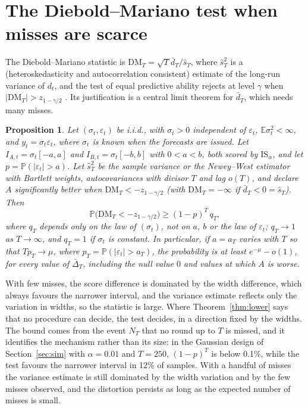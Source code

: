 \documentclass[11pt]{article}
\newtheorem{proposition}{Proposition}
\theoremstyle{remark}
\theoremstyle{definition}
\newcommand{\E}{\mathbb{E}}
\renewcommand{\Pr}{\mathbb{P}}
\newcommand{\IS}{\mathrm{IS}}
\newcommand{\Dbar}{\bar\Delta}
\begin{document}
\section{The Diebold--Mariano test when misses are scarce}
\label{sec:dm}

The Diebold--Mariano statistic is
$\mathrm{DM}_T=\sqrt T\bar d_T/\hat s_T$, where $\hat s_T^2$ is a
(heteroskedasticity and autocorrelation consistent) estimate of the
long-run variance of $d_t$, and the test of equal predictive ability
rejects at level $\gamma$ when $|\mathrm{DM}_T|>z_{1-\gamma/2}$
\citep{diebold1995comparing,newey1987simple}. Its justification is a central
limit theorem for $\bar d_T$, which needs many misses.

\begin{proposition}
\label{prop:dm}
Let $(\sigma_t,\varepsilon_t)$ be i.i.d., with $\sigma_t>0$ independent of
$\varepsilon_t$, $\E\sigma_t^2<\infty$, and $y_t=\sigma_t\varepsilon_t$,
where $\sigma_t$ is known when the forecasts are issued. Let
$I_{A,t}=\sigma_t[-a,a]$ and $I_{B,t}=\sigma_t[-b,b]$ with $0<a<b$, both
scored by $\IS_\alpha$, and let $p=\Pr(|\varepsilon_t|>a)$. Let $\hat s_T^2$
be the sample variance or the Newey--West estimator with Bartlett weights,
autocovariances with divisor $T$ and lag $o(T)$, and declare $A$ significantly better when
$\mathrm{DM}_T<-z_{1-\gamma/2}$ (with $\mathrm{DM}_T=-\infty$ if
$\bar d_T<0=\hat s_T$). Then
\[
 \Pr\bigl(\mathrm{DM}_T<-z_{1-\gamma/2}\bigr)\ge(1-p)^T\,q_T,
\]
where $q_T$ depends only on the law of $(\sigma_t)$, not on $a$, $b$ or
the law of $\varepsilon_t$; $q_T\to1$ as $T\to\infty$, and $q_T=1$ if
$\sigma_t$ is constant. In particular, if $a=a_T$ varies with $T$ so that
$Tp_T\to\mu$, where $p_T=\Pr(|\varepsilon_t|>a_T)$, the probability is at
least $e^{-\mu}-o(1)$, for every value of $\Dbar_T$, including the null
value $0$ and values at which $A$ is worse.
\end{proposition}

With few misses, the score difference is dominated by the width
difference, which always favours the narrower interval, and the variance
estimate reflects only the variation in widths, so the statistic is large.
Where Theorem~\ref{thm:lower} says that no procedure can decide, the test
decides, in a direction fixed by the widths. The bound comes from the
event $N_T$ that no round up to $T$ is missed, and it identifies the
mechanism rather than its size: in the Gaussian design of
Section~\ref{sec:sim} with $\alpha=0.01$ and $T=250$, $(1-p)^T$ is below
0.1\%, while the test favours the narrower interval in 12\% of samples.
With a handful of misses the variance estimate is still dominated by the
width variation and by the few misses observed, and the distortion
persists as long as the expected number of misses is small.
\end{document}

